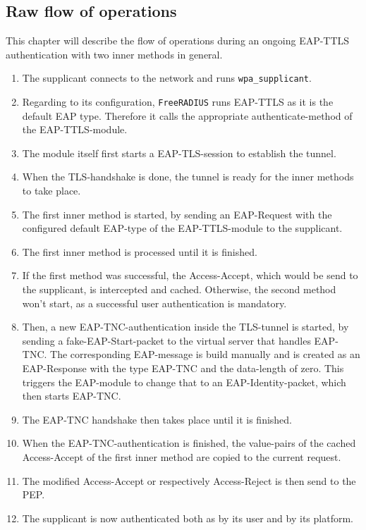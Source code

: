\subsection{Raw flow of operations}
This chapter will describe the flow of operations during an ongoing EAP-TTLS authentication with two inner methods in general.

\begin{enumerate}
\item The supplicant connects to the network and runs \texttt{wpa\_supplicant}.
\item Regarding to its configuration, \texttt{FreeRADIUS} runs EAP-TTLS as it is the default EAP type.
Therefore it calls the appropriate authenticate-method of the EAP-TTLS-module.
\item The module itself first starts a EAP-TLS-session to establish the tunnel.
\item When the TLS-handshake is done, the tunnel is ready for the inner methods to take place.
\item The first inner method is started, by sending an EAP-Request with the configured default EAP-type of the EAP-TTLS-module to the supplicant.
\item The first inner method is processed until it is finished.
\item If the first method was successful, the Access-Accept, which would be send to the supplicant, is intercepted and cached.
Otherwise, the second method won't start, as a successful user authentication is mandatory.
\item Then, a new EAP-TNC-authentication inside the TLS-tunnel is started, by sending a fake-EAP-Start-packet to the virtual server that handles EAP-TNC.
The corresponding EAP-message is build manually and is created as an EAP-Response with the type EAP-TNC and the data-length of zero.
This triggers the EAP-module to change that to an EAP-Identity-packet, which then starts EAP-TNC.
\item The EAP-TNC handshake then takes place until it is finished.
\item When the EAP-TNC-authentication is finished, the value-pairs of the cached Access-Accept of the first inner method are copied to the current request.
\item The modified Access-Accept or respectively Access-Reject is then send to the PEP.
\item The supplicant is now authenticated both as by its user and by its platform.
\end{enumerate}
